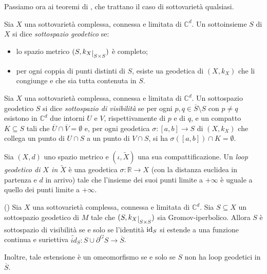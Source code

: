 Passiamo ora ai teoremi di \cite{CMS}, che trattano il caso di sottovarietà qualsiasi.

\begin{defn}
    Sia $X$ una sottovarietà complessa, connessa e limitata di $\mathbb{C}^d$. Un sottoinsieme $S$ di $X$ si dice \textit{sottospazio geodetico} se:
    \begin{itemize}
        \item lo spazio metrico $(S,k_X\restrict{S\times S})$ è completo;
        \item per ogni coppia di punti distinti di $S$, esiste ua geodetica di $(X,k_X)$ che li congiunge e che sia tutta contenuta in $S$.
    \end{itemize}
\end{defn}

\begin{defn}
    Sia $X$ una sottovarietà complessa, connessa e limitata di $\mathbb{C}^d$. Un sottospazio geodetico $S$ si dice \textit{sottospazio di visibilità} se per ogni $p,q\in\overline{S}\setminus S$ con $p\not=q$ esistono in $\mathbb{C}^d$ due intorni $U$ e $V$, rispettivamente di $p$ e di $q$, e un compatto $K\subseteq S$ tali che $\overline{U}\cap\overline{V}=\emptyset$ e, per ogni geodetica $\sigma:[a,b]\longrightarrow S$ di $(X,k_X)$ che collega un punto di $U\cap S$ a un punto di $V\cap S$, si ha $\sigma([a,b])\cap K=\emptyset$.
\end{defn}

\begin{defn}
    Sia $(X,d)$ uno spazio metrico e $(\iota,\tilde{X})$ una sua compattificazione. Un \textit{loop geodetico di $X$ in $\tilde{X}$} è una geodetica $\sigma:\mathbb{R}\longrightarrow X$ (con la distanza euclidea in partenza e $d$ in arrivo) tale che l'insieme dei suoi punti limite a $+\infty$ è uguale a quello dei punti limite a $+\infty$.
\end{defn}

\begin{thm}
    (\cite[Theorem 1.4]{CMS}) Sia $X$ una sottovarietà complessa, connessa e limitata di $\mathbb{C}^d$. Sia $S\subseteq X$ un sottospazio geodetico di $M$ tale che $(S,k_X\restrict{S\times S})$ sia Gromov-iperbolico. Allora $S$ è sottospazio di visibilità se e solo se l'identità $\operatorname{id}_S$ si estende a una funzione continua e suriettiva $\tilde{id}_S:S\cup\partial^GS\longrightarrow\overline{S}$.

    Inoltre, tale estensione è un omeomorfismo se e solo se $S$ non ha loop geodetici in $\overline{S}$.
\end{thm}

